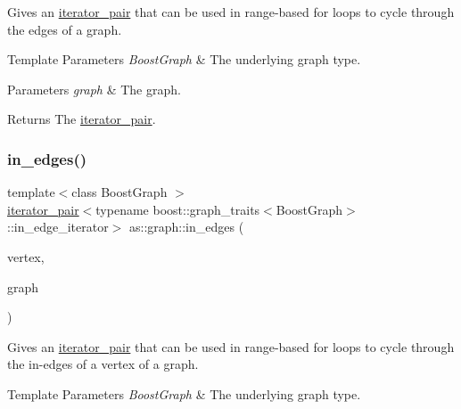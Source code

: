 Gives an \hyperlink{classas_1_1iterator__pair}{iterator\+\_\+pair} that can be used in range-\/based for loops to cycle through the edges of a graph. 


\begin{DoxyTemplParams}{Template Parameters}
{\em Boost\+Graph} & The underlying graph type. \\
\hline
\end{DoxyTemplParams}

\begin{DoxyParams}{Parameters}
{\em graph} & The graph. \\
\hline
\end{DoxyParams}
\begin{DoxyReturn}{Returns}
The \hyperlink{classas_1_1iterator__pair}{iterator\+\_\+pair}. 
\end{DoxyReturn}
\mbox{\label{namespaceas_1_1graph_ab75a465b1d5869f0ea8b698f02b067aa}} 
\subsubsection{\texorpdfstring{in\+\_\+edges()}{in\_edges()}}
{\footnotesize\ttfamily template$<$class Boost\+Graph $>$ \\
\hyperlink{classas_1_1iterator__pair}{iterator\+\_\+pair}$<$typename boost\+::graph\+\_\+traits$<$Boost\+Graph$>$\+::in\+\_\+edge\+\_\+iterator$>$ as\+::graph\+::in\+\_\+edges (\begin{DoxyParamCaption}\item[{const typename boost\+::graph\+\_\+traits$<$ Boost\+Graph $>$\+::vertex\+\_\+descriptor \&}]{vertex,  }\item[{const Boost\+Graph \&}]{graph }\end{DoxyParamCaption})\hspace{0.3cm}{\ttfamily [inline]}}



Gives an \hyperlink{classas_1_1iterator__pair}{iterator\+\_\+pair} that can be used in range-\/based for loops to cycle through the in-\/edges of a vertex of a graph. 


\begin{DoxyTemplParams}{Template Parameters}
{\em Boost\+Graph} & The underlying graph type. \\
\hline
\end{DoxyTemplParams}

